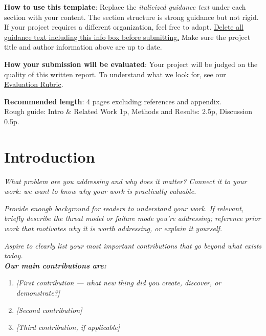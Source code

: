 \documentclass[11pt]{article}
\begin{document}
\vspace{1.0em}
\begin{tcolorbox}[colback=yellow!12,colframe=black!70,boxrule=0.6pt,arc=0pt,left=8pt,right=8pt,top=6pt,bottom=6pt]
\textbf{How to use this template}: Replace the \textit{italicized guidance text} under each
section with your content. The section structure is strong guidance but not rigid. If your
project requires a different organization, feel free to adapt. \uline{Delete all guidance
text including this info box before submitting.} Make sure the project title and author
information above are up to date.

\vspace{0.6em}
\textbf{How your submission will be evaluated}: Your project will be judged on the quality of
this written report. To understand what we look for, see our
\href{https://apartresearch.notion.site/sprint-evaluation-rubric}{Evaluation Rubric}.

\vspace{0.6em}
\textbf{Recommended length}: 4 pages excluding references and appendix.\\
Rough guide: Intro \& Related Work 1p, Methods and Results: 2.5p, Discussion 0.5p.
\end{tcolorbox}

\vspace{1.4em}

\section{Introduction}

\textit{What problem are you addressing and why does it matter?
Connect it to your work: we want to know why your work is practically valuable.}

\textit{Provide enough background for readers to understand your work.
If relevant, briefly describe the threat model or failure mode you're addressing; reference
prior work that motivates why it is worth addressing, or explain it yourself.}

\textit{Aspire to clearly list your most important contributions that go beyond what exists
today.}\\
\textit{\textbf{Our main contributions are:}}

\begin{enumerate}
  \item \textit{[First contribution --- what new thing did you create, discover, or demonstrate?]}
  \item \textit{[Second contribution]}
  \item \textit{[Third contribution, if applicable]}
\end{enumerate}
\end{document}
